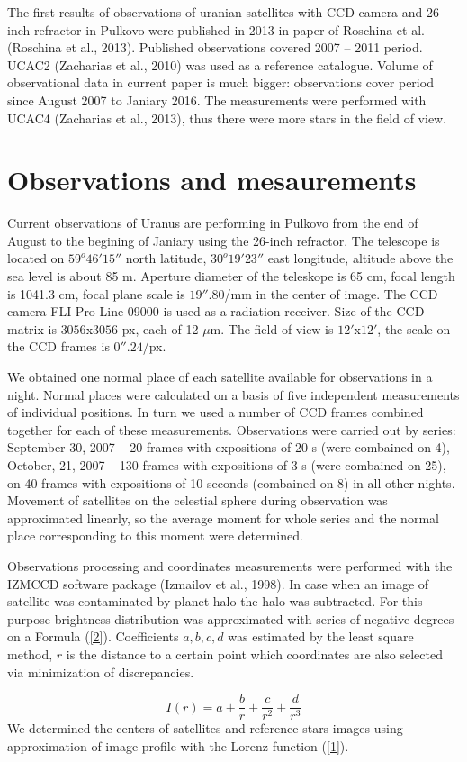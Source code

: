 \documentclass[]{article}
\begin{document}
The first results of observations of uranian satellites with CCD-camera and 26-inch refractor in Pulkovo were published in 2013 in paper of Roschina et al. (Roschina et al., 2013). Published observations covered 2007 -- 2011 period. UCAC2 (Zacharias et al., 2010) was used as a reference catalogue. Volume of observational data in current paper is much bigger: observations cover period since August 2007 to Janiary 2016. The measurements were performed with UCAC4 (Zacharias et al., 2013), thus there were more stars in the field of view.

\section{Observations and mesaurements}
Current observations of Uranus are performing in Pulkovo from the end of August to the begining of Janiary using the 26-inch refractor. The telescope is located on $59^o46' 15''$ north latitude, $30^o19'23''$ east longitude, altitude above the sea level is about 85 m.  Aperture diameter of the teleskope is 65 cm, focal length is 1041.3 cm, focal plane scale is $19''.80$/mm in the center of image. The CCD camera FLI Pro Line 09000  is used as a radiation receiver. Size of the CCD matrix is $3056$x$3056$ px, each of 12 $\mu$m.  The field of view is $12'$x$12'$, the scale on the CCD frames is $0''.24$/px.\par

We obtained one normal place of each satellite available for observations in a night. Normal places were calculated on a basis of five independent measurements of individual positions.  In turn we used a number of CCD frames combined together for each of these measurements. Observations were carried out by series: September 30, 2007 -- 20 frames with expositions of 20 s (were combained on 4), October, 21, 2007 -- 130 frames with expositions of 3 s (were combained on 25), on 40 frames with expositions of 10 seconds (combained on 8) in all other nights. Movement of satellites on the celestial sphere during observation was approximated linearly, so the average moment for whole series and the normal place corresponding to this moment were determined.\par
Observations processing and coordinates measurements were performed with the IZMCCD software package (Izmailov et al., 1998). In case when an image of satellite was contaminated by planet halo the halo was subtracted. For this purpose brightness distribution was approximated with series of negative degrees on a Formula (\ref{2}). Coefficients $a, b, c, d$ was estimated by the least square method, $r$ is the distance to a certain point which coordinates are also selected via minimization of discrepancies.\par
\begin{equation}
\label{2}
I(r) = a + \frac{b}{r} + \frac{c}{r^2} + \frac{d}{r^3}
\end{equation}
We determined the centers of satellites and reference stars images using approximation of image profile with the Lorenz function (\ref{1}).
\end{document}
